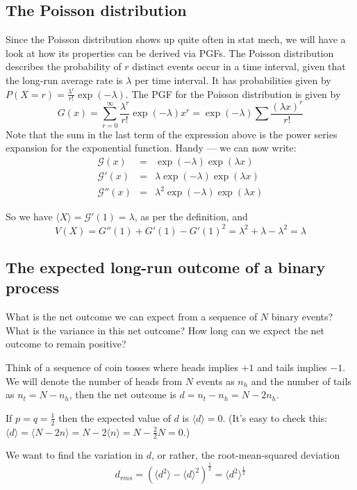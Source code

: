 \documentclass{article}
\newcommand{\calG}{\mathcal{G}}
\begin{document}
\subsection{The Poisson distribution}
Since the Poisson distribution shows up quite often in stat mech, we will have a look at how its properties can be derived via PGFs.
The Poisson distribution describes the probability of $r$ distinct events occur in a time interval, given that the long-run average rate is $\lambda$ per time interval. It has probabilities given by $P(X=r) = \frac{\lambda^r}{r!}\exp(-\lambda)$. The PGF for the Poisson distribution is given by
$$G(x) = \sum_{r=0}^\infty \frac{\lambda^r}{r!}\exp(-\lambda)x^r = \exp(-\lambda)\sum\frac{(\lambda x)^r}{r!}$$
Note that the sum in the last term of the expression above is the power series expansion for the exponential function. Handy --- we can now write:
\begin{eqnarray*}
\calG(x) &=& \exp(-\lambda)\exp(\lambda x)\\
\calG'(x) &=& \lambda\exp(-\lambda)\exp(\lambda x)\\
\calG''(x)&=&\lambda^2\exp(-\lambda)\exp(\lambda x)
\end{eqnarray*}

So we have $\langle X \rangle = \calG'(1) = \lambda$, as per the definition, and
$$V(X) = G''(1) + G'(1) - G'(1)^2 = \lambda^2+\lambda-\lambda^2 = \lambda$$

\subsection{The expected long-run outcome of a binary process}
What is the net outcome we can expect from a sequence of $N$ binary events? What is the variance in this net outcome? How long can we expect the net outcome to remain positive? 

Think of a sequence of coin tosses where heads implies $+1$ and tails implies $-1$. We will denote the number of heads from $N$ events as $n_h$ and the number of tails as $n_t = N-n_h$, then the net outcome is $d = n_t-n_h = N-2n_h$. 

If $p=q=\frac12$ then the expected value of $d$ is $\langle d\rangle= 0$. (It's easy to check this: $\langle d\rangle = \langle N-2n\rangle = N-2\langle n\rangle = N-\frac{2}{2}N=0.$)

We want to find the variation in $d$, or rather, the root-mean-squared deviation 
$$d_{rms} = \left(\langle d^2\rangle - \langle d\rangle^2\right)^{\frac12} =  \langle d^2\rangle^{\frac12}$$
\end{document}
